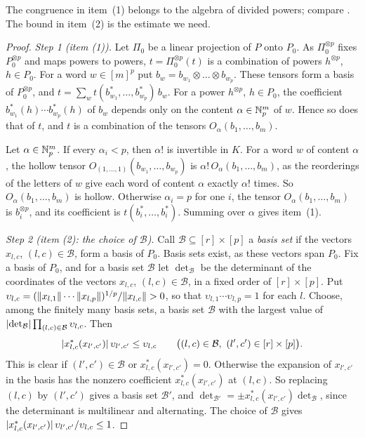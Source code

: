 The congruence in item~(1) belongs to the algebra of divided powers; compare \cite[Th.~IV.2, Prop.~III.1 and App.~I, Props.~1,~2]{Ro}. The bound in item~(2) is the estimate we need.

\begin{proof}
\emph{Step 1 (item (1)).} Let $\Pi_0$ be a linear projection of $P$ onto $P_0$. As $\Pi_0^{\otimes p}$ fixes $P_0^{\otimes p}$ and maps powers to powers, $t=\Pi_0^{\otimes p}(t)$ is a combination of powers $h^{\otimes p}$, $h\in P_0$. For a word $w\in[m]^p$ put $b_w=b_{w_1}\otimes\dots\otimes b_{w_p}$. These tensors form a basis of $P_0^{\otimes p}$, and $t=\sum_wt(b_{w_1}^*,\dots,b_{w_p}^*)\,b_w$. For a power $h^{\otimes p}$, $h\in P_0$, the coefficient $b_{w_1}^*(h)\cdots b_{w_p}^*(h)$ of $b_w$ depends only on the content $\alpha\in\mathbb N^m_p$ of $w$. Hence so does that of $t$, and $t$ is a combination of the tensors $O_\alpha(b_1,\dots,b_m)$.

Let $\alpha\in\mathbb N^m_p$. If every $\alpha_i<p$, then $\alpha!$ is invertible in $K$. For a word $w$ of content $\alpha$, the hollow tensor $O_{(1,\dots,1)}(b_{w_1},\dots,b_{w_p})$ is $\alpha!\,O_\alpha(b_1,\dots,b_m)$, as the reorderings of the letters of $w$ give each word of content $\alpha$ exactly $\alpha!$ times. So $O_\alpha(b_1,\dots,b_m)$ is hollow. Otherwise $\alpha_i=p$ for one $i$, the tensor $O_\alpha(b_1,\dots,b_m)$ is $b_i^{\otimes p}$, and its coefficient is $t(b_i^*,\dots,b_i^*)$. Summing over $\alpha$ gives item~(1).

\emph{Step 2 (item (2): the choice of $\mathcal B$).} Call $\mathcal B\subseteq[r]\times[p]$ a \emph{basis set} if the vectors $x_{l,c}$, $(l,c)\in\mathcal B$, form a basis of $P_0$. Basis sets exist, as these vectors span $P_0$. Fix a basis of $P_0$, and for a basis set $\mathcal B$ let $\det_{\mathcal B}$ be the determinant of the coordinates of the vectors $x_{l,c}$, $(l,c)\in\mathcal B$, in a fixed order of $[r]\times[p]$. Put $\upsilon_{l,c}=(\lVert x_{l,1}\rVert\cdots\lVert x_{l,p}\rVert)^{1/p}/\lVert x_{l,c}\rVert>0$, so that $\upsilon_{l,1}\cdots\upsilon_{l,p}=1$ for each $l$. Choose, among the finitely many basis sets, a basis set $\mathcal B$ with the largest value of $\lvert \det_{\mathcal B}\rvert\prod_{(l,c)\in\mathcal B}\upsilon_{l,c}$. Then
\begin{equation}\label{dp:eq:exchange}
 \lvert x_{l,c}^*(x_{l',c'})\rvert\,\upsilon_{l',c'}\le\upsilon_{l,c}\qquad
 \bigl((l,c)\in\mathcal B,\ (l',c')\in[r]\times[p]\bigr).
\end{equation}
This is clear if $(l',c')\in\mathcal B$ or $x_{l,c}^*(x_{l',c'})=0$. Otherwise the expansion of $x_{l',c'}$ in the basis has the nonzero coefficient $x_{l,c}^*(x_{l',c'})$ at $(l,c)$. So replacing $(l,c)$ by $(l',c')$ gives a basis set $\mathcal B'$, and $\det_{\mathcal B'}=\pm x_{l,c}^*(x_{l',c'})\det_{\mathcal B}$, since the determinant is multilinear and alternating. The choice of $\mathcal B$ gives $\lvert x_{l,c}^*(x_{l',c'})\rvert\,\upsilon_{l',c'}/\upsilon_{l,c}\le1$.


\end{proof}
